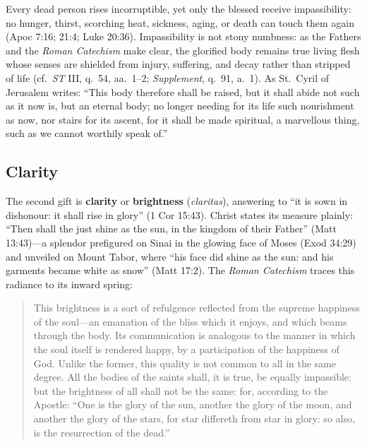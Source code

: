 Every dead person rises incorruptible, yet only the blessed receive impassibility: no hunger, thirst, scorching heat, sickness, aging, or death can touch them again (Apoc 7:16; 21:4; Luke 20:36). Impassibility is not stony numbness: as the Fathers and the \textit{Roman Catechism} make clear, the glorified body remains true living flesh whose senses are shielded from injury, suffering, and decay rather than stripped of life (cf.\ \textit{ST} III, q.\ 54, aa.\ 1--2; \textit{Supplement}, q.\ 91, a.\ 1). As St.\ Cyril of Jerusalem writes: ``This body therefore shall be raised, but it shall abide not such as it now is, but an eternal body; no longer needing for its life such nourishment as now, nor stairs for its ascent, for it shall be made spiritual, a marvellous thing, such as we cannot worthily speak of.''

\subsection*{Clarity}

The second gift is \textbf{clarity} or \textbf{brightness} (\textit{claritas}), answering to ``it is sown in dishonour: it shall rise in glory'' (1 Cor 15:43). Christ states its measure plainly: ``Then shall the just shine as the sun, in the kingdom of their Father'' (Matt 13:43)---a splendor prefigured on Sinai in the glowing face of Moses (Exod 34:29) and unveiled on Mount Tabor, where ``his face did shine as the sun: and his garments became white as snow'' (Matt 17:2). The \textit{Roman Catechism} traces this radiance to its inward spring:

\begin{quote}
This brightness is a sort of refulgence reflected from the supreme happiness of the soul---an emanation of the bliss which it enjoys, and which beams through the body. Its communication is analogous to the manner in which the soul itself is rendered happy, by a participation of the happiness of God. Unlike the former, this quality is not common to all in the same degree. All the bodies of the saints shall, it is true, be equally impassible: but the brightness of all shall not be the same: for, according to the Apostle: ``One is the glory of the sun, another the glory of the moon, and another the glory of the stars, for star differeth from star in glory: so also, is the resurrection of the dead.''
\end{quote}

